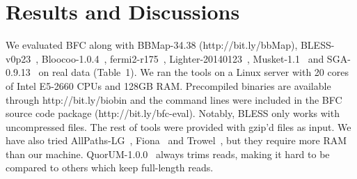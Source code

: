 \documentclass{bioinfo}
\begin{document}
\section{Results and Discussions}

We evaluated BFC along with BBMap-34.38 (\mbox{http://bit.ly/bbMap}),
BLESS-v0p23~\citep{Heo:2014aa}, Bloocoo-1.0.4~\citep{Drezen:2014aa},
fermi2-r175~\citep{Li:2012fk}, Lighter-20140123~\citep{Song:2014aa},
Musket-1.1~\citep{Liu:2013ac} and SGA-0.9.13~\citep{Simpson:2012aa} on real
data (Table~1). We ran the tools on a Linux server with 20 cores of Intel
E5-2660 CPUs and 128GB RAM. Precompiled binaries are available through
http://bit.ly/biobin and the command lines were included in the BFC source code
package (http://bit.ly/bfc-eval).  Notably, BLESS only works with uncompressed
files. The rest of tools were provided with gzip'd files as input. We have also
tried AllPaths-LG~\citep{Gnerre:2011ys}, Fiona~\citep{Schulz:2014aa} and
Trowel~\citep{Lim:2014aa}, but they require more RAM than our machine.
QuorUM-1.0.0~\citep{Zimin:2013aa} always trims reads, making it hard to be
compared to others which keep full-length reads.
\end{document}
